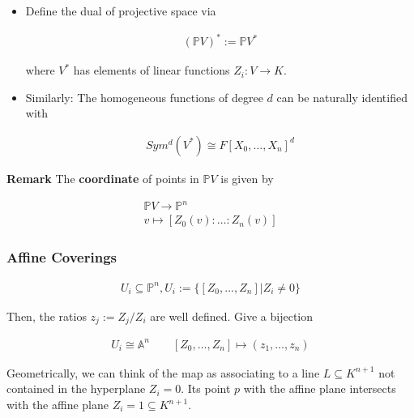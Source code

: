 \documentclass[Total.tex]{subfiles}
\begin{document}
			
			
			\begin{Def}
				\begin{itemize}
					\item Define the dual of projective space via
					
					\begin{gather*}
						(\mathbb{P}V)^*:=\mathbb{P}V^*
					\end{gather*}
					
					where $V^*$ has elements of linear functions $Z_i:V\rightarrow K$.
					
					\item Similarly: The homogeneous functions of degree $d$ can be naturally identified with
					
					\begin{gather*}
						Sym^d(V^*)\cong F[X_0,\dots,X_n]^d
					\end{gather*}
				\end{itemize}
			\end{Def}
			
			\textbf{Remark} The \textbf{coordinate} of points in $\mathbb{P}V$ is given by
			
			\begin{gather*}
				\mathbb{P}V\rightarrow \mathbb{P}^n\\
				v\mapsto [Z_0(v):\dots:Z_n(v)]
			\end{gather*}
			
			\newpage
			
			\subsubsection{Affine Coverings}
			
			\begin{Def}
				\begin{gather*}
					U_i\subseteq \mathbb{P}^n,U_i:=\{[Z_0,\dots,Z_n]|Z_i\not=0\}
				\end{gather*}
				
				Then, the ratios $z_j:=Z_j/Z_i$ are well defined. Give a bijection
				
				\begin{gather*}
					U_i\cong \mathbb{A}^n\qquad [Z_0,\dots,Z_n]\mapsto (z_1,\dots,z_n)
				\end{gather*}
			\end{Def}
			
			Geometrically, we can think of the map as associating to a line $L\subseteq K^{n+1}$ not contained in the hyperplane $Z_i=0$. Its point $p$ with the affine plane intersects with the affine plane $Z_i=1\subseteq K^{n+1}$.
			
\end{document}
